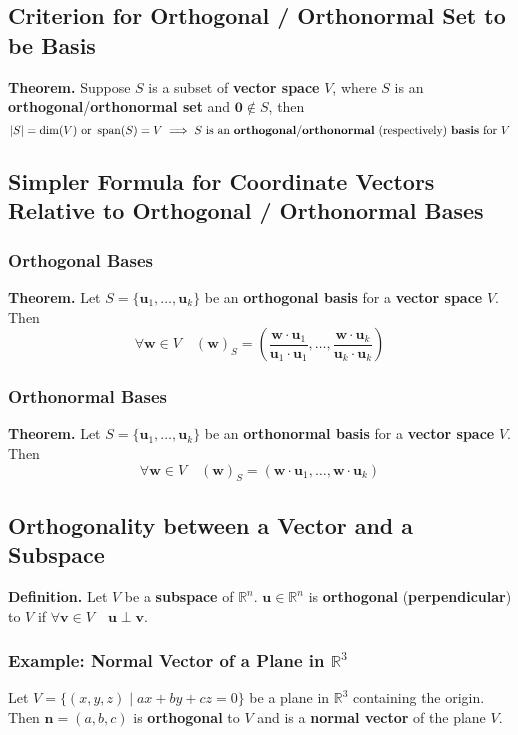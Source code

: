 \documentclass[../ma2001_notes.tex]{subfiles}
\begin{document}
\subsection{Criterion for Orthogonal / Orthonormal Set to be Basis}
\textbf{Theorem.} Suppose \(S\) is a subset of \textbf{vector space} \(V\), where \(S\) is an \textbf{orthogonal}/\textbf{orthonormal set} and \(\bm{0}\notin S\), then
\[\lvert S\rvert=\dim(V)\text{ or }\operatorname{span}(S)=V\implies S\text{ is an }\textbf{orthogonal}/\textbf{orthonormal}\text{ (respectively) }\textbf{basis}\text{ for }V\]

\subsection{Simpler Formula for Coordinate Vectors Relative to Orthogonal / Orthonormal Bases}
\subsubsection{Orthogonal Bases}
\textbf{Theorem.} Let \(S=\{\bm{u}_1,\ldots,\bm{u}_k\}\) be an \textbf{orthogonal basis} for a \textbf{vector space} \(V\). Then
\[\forall\bm{w}\in V\quad(\bm{w})_S=\left(\frac{\bm{w}\cdot\bm{u}_1}{\bm{u}_1\cdot\bm{u}_1},\ldots,\frac{\bm{w}\cdot\bm{u}_k}{\bm{u}_k\cdot\bm{u}_k}\right)\]

\subsubsection{Orthonormal Bases}
\textbf{Theorem.} Let \(S=\{\bm{u}_1,\ldots,\bm{u}_k\}\) be an \textbf{orthonormal basis} for a \textbf{vector space} \(V\). Then
\[\forall\bm{w}\in V\quad(\bm{w})_S=\left(\bm{w}\cdot\bm{u}_1,\ldots,\bm{w}\cdot\bm{u}_k\right)\]

\subsection{Orthogonality between a Vector and a Subspace}
\textbf{Definition.} Let \(V\) be a \textbf{subspace} of \(\mathbb{R}^n\). \(\bm{u}\in\mathbb{R}^n\) is \textbf{orthogonal} (\textbf{perpendicular}) to \(V\) if \(\forall\bm{v}\in V\quad\bm{u}\perp\bm{v}\).

\subsubsection{Example: Normal Vector of a Plane in $\mathbb{R}^3$}
Let \(V=\{(x,y,z)\mid ax+by+cz=0\}\) be a plane in \(\mathbb{R}^3\) containing the origin. Then \(\bm{n}=(a,b,c)\) is \textbf{orthogonal} to \(V\) and is a \textbf{normal vector} of the plane \(V\).
\end{document}
